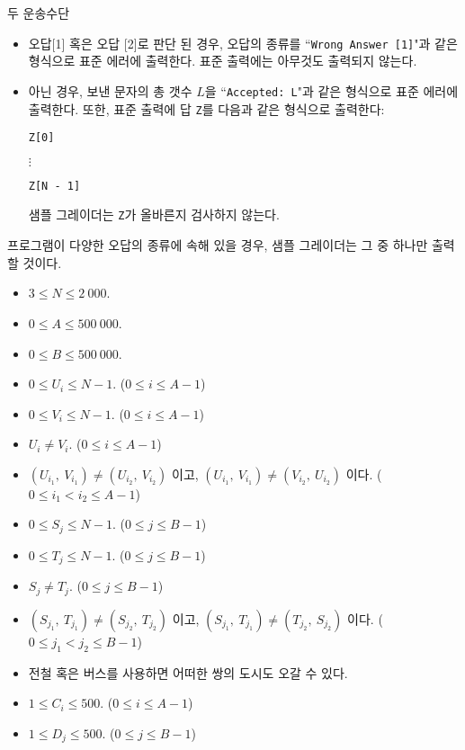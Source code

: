 \begin{problem}{두 운송수단}
	\begin{itemize}
		\item 오답[1] 혹은 오답 [2]로 판단 된 경우, 오답의 종류를 ``\texttt{Wrong Answer [1]}"과 같은 형식으로 표준 에러에 출력한다. 표준 출력에는 아무것도 출력되지 않는다.
		
		\item 아닌 경우, 보낸 문자의 총 갯수 $L$을 ``\texttt{Accepted: L}"과 같은 형식으로 표준 에러에 출력한다. 또한, 표준 출력에 답 \texttt{Z}를 다음과 같은 형식으로 출력한다:
		
		\texttt{Z[0]}

		$\vdots$

		\texttt{Z[N - 1]}
		
		샘플 그레이더는 \texttt{Z}가 올바른지 검사하지 않는다.
	\end{itemize}
	
	프로그램이 다양한 오답의 종류에 속해 있을 경우, 샘플 그레이더는 그 중 하나만 출력 할 것이다.
	
	\Constraints
	
	\begin{itemize}
		\item $3 \le N \le 2\ 000$.
		\item $0 \le A \le 500\ 000$.
		\item $0 \le B \le 500\ 000$.
		\item $0 \le U_i \le N-1$. ($0 \le i \le A-1$)
		\item $0 \le V_i \le N-1$. ($0 \le i \le A-1$)
		\item $U_i \ne V_i$. ($0 \le i \le A-1$)
		\item $(U_{i_1},\ V_{i_1}) \ne (U_{i_2},\ V_{i_2})$ 이고, $(U_{i_1},\ V_{i_1}) \ne (V_{i_2},\ U_{i_2})$ 이다. ($0 \le i_1 < i_2 \le A-1$)
		\item $0 \le S_j \le N-1$. ($0 \le j \le B-1$)
		\item $0 \le T_j \le N-1$. ($0 \le j \le B-1$)
		\item $S_j \ne T_j$. ($0 \le j \le B-1$)
		\item $(S_{j_1},\ T_{j_1}) \ne (S_{j_2},\ T_{j_2})$ 이고, $(S_{j_1},\ T_{j_1}) \ne (T_{j_2},\ S_{j_2})$ 이다. ($0 \le j_1 < j_2 \le B-1$)
		\item 전철 혹은 버스를 사용하면 어떠한 쌍의 도시도 오갈 수 있다.
		\item $1 \le C_i \le 500$. ($0 \le i \le A-1$)
		\item $1 \le D_j \le 500$. ($0 \le j \le B-1$) 
	\end{itemize}
	

\end{problem}
